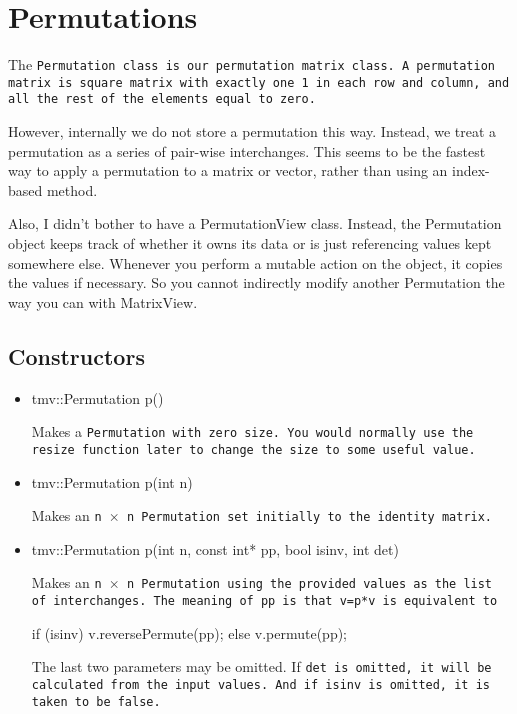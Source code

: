 
\section{Permutations}
\label{Permutation}

The \tt{Permutation} class is our permutation matrix class.
A permutation matrix is square matrix with exactly one 1 in each row and
column, and all the rest of the elements equal to zero.

However, internally we do not store a permutation this way.
Instead, we treat a permutation as a series of pair-wise interchanges.
This seems to be the fastest way to apply a permutation to a matrix or
vector, rather than using an index-based method.

Also, I didn't bother to have a PermutationView class.  Instead, the 
Permutation object keeps track of whether it owns its data or is just
referencing values kept somewhere else.  Whenever you perform 
a mutable action on the object, it copies the values if necessary.
So you cannot indirectly modify another Permutation the way you can
with MatrixView.

\subsection{Constructors}
\label{Permutation_Constructors}

\begin{itemize}

\item
\begin{tmvcode}
tmv::Permutation p()
\end{tmvcode}
Makes a \tt{Permutation} with zero size.  You would normally use the \tt{resize} function later to
change the size to some useful value.

\item 
\begin{tmvcode}
tmv::Permutation p(int n)
\end{tmvcode}
Makes an \tt{n} $\times$ \tt{n} \tt{Permutation} set initially to the identity matrix.

\item
\begin{tmvcode}
tmv::Permutation p(int n, const int* pp, bool isinv, int det)
\end{tmvcode}
Makes an \tt{n} $\times$ \tt{n} \tt{Permutation} using the provided values as the 
list of interchanges.  The meaning of pp is that \tt{v=p*v} is equivalent to
\begin{tmvcode}
if (isinv) v.reversePermute(pp);
else v.permute(pp);
\end{tmvcode}
The last two parameters may be omitted.  If \tt{det} is omitted, it will be calculated
from the input values.  And if \tt{isinv} is omitted, it is taken to be \tt{false}.

\end{itemize}


